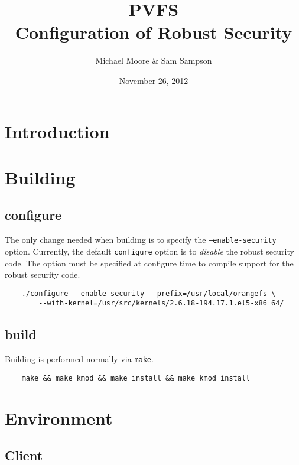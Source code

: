 \documentclass[11pt, letterpaper]{article}
\title{PVFS\\Configuration of Robust Security}
\author{ Michael Moore & Sam Sampson }
\date{ November 26, 2012 }
\begin{document}
\maketitle

\tableofcontents

\newpage

\thispagestyle{plain}


\section{Introduction}

\section{Building}

\subsection{configure}
The only change needed when building is to specify the 
\texttt{--enable-security} option. Currently, the default \texttt{configure} 
option is to \emph{disable} the robust security code. The option must be 
specified at configure time to compile support for the robust security code.

\begin{verbatim}
    ./configure --enable-security --prefix=/usr/local/orangefs \
        --with-kernel=/usr/src/kernels/2.6.18-194.17.1.el5-x86_64/
\end{verbatim}

\subsection{build}
Building is performed normally via \texttt{make}.

\begin{verbatim}
    make && make kmod && make install && make kmod_install
\end{verbatim}

\section{Environment}

\subsection{Client}
\end{document}
